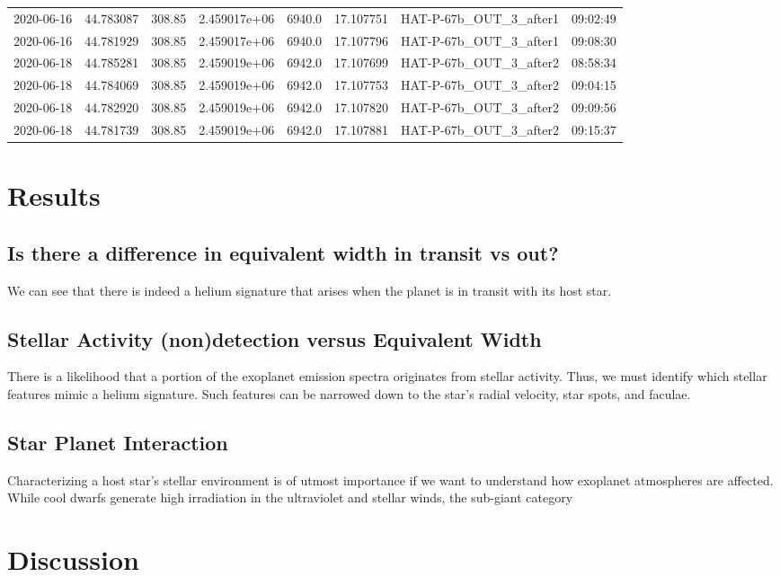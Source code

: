 \documentclass{aastex631}
\begin{document}
\begin{tabular}{lrrrlrll}
    2020-06-16 & 44.783087   & 308.85        & 2.459017e+06 & 6940.0 & 17.107751 & HAT-P-67b\_OUT\_3\_after1  & 09:02:49 \\
    2020-06-16 & 44.781929   & 308.85        & 2.459017e+06 & 6940.0 & 17.107796 & HAT-P-67b\_OUT\_3\_after1  & 09:08:30 \\
    2020-06-18 & 44.785281   & 308.85        & 2.459019e+06 & 6942.0 & 17.107699 & HAT-P-67b\_OUT\_3\_after2  & 08:58:34 \\
    2020-06-18 & 44.784069   & 308.85        & 2.459019e+06 & 6942.0 & 17.107753 & HAT-P-67b\_OUT\_3\_after2  & 09:04:15 \\
    2020-06-18 & 44.782920   & 308.85        & 2.459019e+06 & 6942.0 & 17.107820 & HAT-P-67b\_OUT\_3\_after2  & 09:09:56 \\
    2020-06-18 & 44.781739   & 308.85        & 2.459019e+06 & 6942.0 & 17.107881 & HAT-P-67b\_OUT\_3\_after2  & 09:15:37 \\
    \bottomrule
\end{tabular}


\section{Results}
\subsection{Is there a difference in equivalent width in transit vs out?}
We can see that there is indeed a helium signature that arises when the planet is in transit with its host star.
\subsection{Stellar Activity (non)detection versus Equivalent Width}
There is a likelihood that a portion of the exoplanet emission spectra originates from stellar activity. Thus, we must identify which stellar features mimic a helium signature. Such features can be narrowed down to the star's radial velocity, star spots, and faculae.
\subsection{Star Planet Interaction}
Characterizing a host star's stellar environment is of utmost importance if we want to understand how exoplanet atmospheres are affected. While cool dwarfs generate high irradiation in the ultraviolet and stellar winds, the sub-giant category

\section{Discussion}
\end{document}
